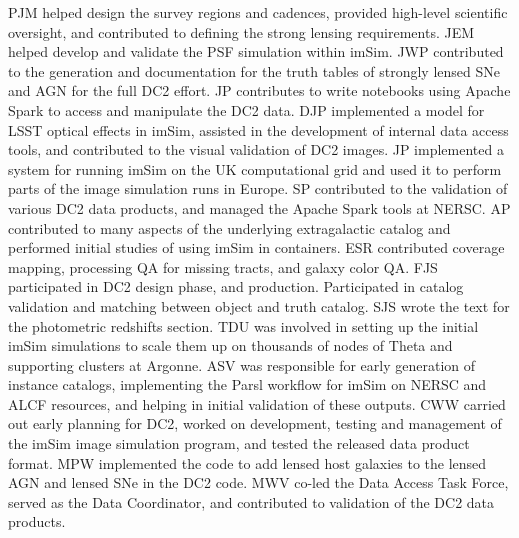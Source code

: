 \documentclass[modern]{descnote}
\begin{document}
%
PJM helped design the survey regions and cadences, provided high-level scientific oversight, and contributed to defining the strong lensing requirements.
%
JEM helped develop and validate the PSF simulation within imSim.
%
JWP contributed to the generation and documentation for the truth tables of strongly lensed SNe and AGN for the full DC2 effort.
%
JP contributes to write notebooks using Apache Spark to access and manipulate the DC2 data.
%
DJP implemented a model for LSST optical effects in imSim, assisted in the development of internal data access tools, and contributed to the visual validation of DC2 images.
%
JP implemented a system for running imSim on the UK computational grid and used it to perform parts of the image simulation runs in Europe.
%
SP contributed to the validation of various DC2 data products, and managed the Apache Spark tools at NERSC.
%
AP contributed to many aspects of the underlying extragalactic catalog and performed initial studies of using imSim in containers.
%
ESR contributed coverage mapping, processing QA for missing tracts, and galaxy color QA.
%
FJS participated in DC2 design phase, and production. Participated in catalog validation and matching between object and truth catalog.
%
SJS wrote the text for the photometric redshifts section.
%
TDU was involved in setting up the initial imSim simulations to scale them up  on thousands of nodes of Theta and supporting clusters at Argonne.
ASV was responsible for early generation of instance catalogs, implementing the Parsl workflow for imSim on NERSC and ALCF resources, and helping in initial validation of these outputs.
%
CWW carried out early planning for DC2, worked on development, testing and management of the imSim image simulation program, and tested the released data product format.
%
MPW implemented the code to add lensed host galaxies to the lensed AGN and lensed SNe in the DC2 code.
%
MWV co-led the Data Access Task Force, served as the Data Coordinator, and contributed to validation of the DC2 data products.
%

\clearpage
{}
{}



\end{document}
